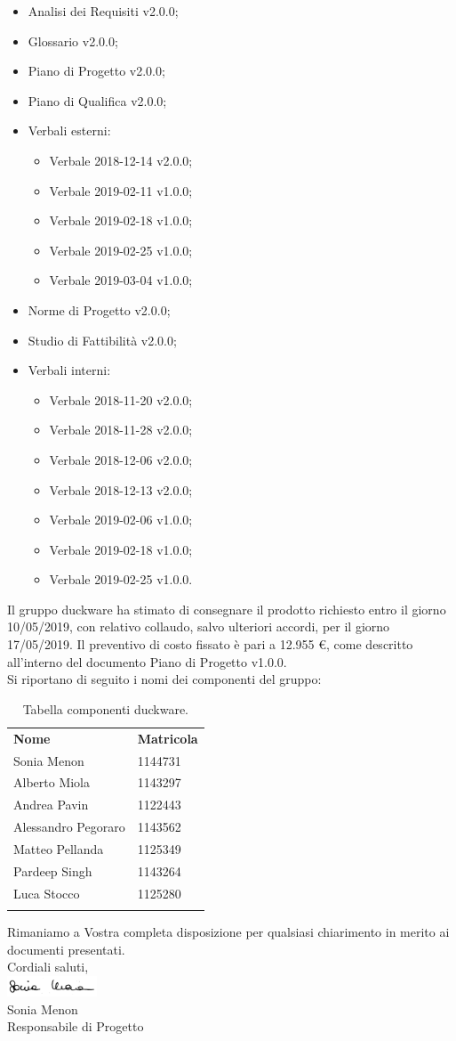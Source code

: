 \documentclass[a4paper,12pt]{article}
\begin{document}
\begin{itemize}
\item Analisi dei Requisiti v2.0.0;
\item Glossario v2.0.0;
\item Piano di Progetto v2.0.0;
\item Piano di Qualifica v2.0.0;
\item Verbali esterni:
	\begin{itemize}
		\item Verbale 2018-12-14 v2.0.0;
		\item Verbale 2019-02-11 v1.0.0;
		\item Verbale 2019-02-18 v1.0.0;
		\item Verbale 2019-02-25 v1.0.0;
		\item Verbale 2019-03-04 v1.0.0;
	\end{itemize}
\item Norme di Progetto v2.0.0;
\item Studio di Fattibilità v2.0.0;
\item Verbali interni:
	\begin{itemize}
		\item Verbale 2018-11-20 v2.0.0;
		\item Verbale 2018-11-28 v2.0.0;
		\item Verbale 2018-12-06 v2.0.0;
		\item Verbale 2018-12-13 v2.0.0;
		\item Verbale 2019-02-06 v1.0.0;
		\item Verbale 2019-02-18 v1.0.0;
		\item Verbale 2019-02-25 v1.0.0.
	\end{itemize}
\end{itemize}
Il gruppo duckware ha stimato di consegnare il prodotto richiesto entro il giorno 10/05/2019, con relativo collaudo, salvo ulteriori accordi, per il giorno 17/05/2019. Il preventivo di costo fissato è pari a 12.955 \euro, come descritto all’interno del documento Piano di Progetto v1.0.0.\\[0.5cm]
Si riportano di seguito i nomi dei componenti del gruppo:
\begin{center}
	\renewcommand{\arraystretch}{1.5}
	\begin{longtable}{  p{4cm}  p{2cm}  }
		\rowcolor{tableHeadYellow}
		\textbf{Nome}   & \textbf{Matricola} \\
		Sonia Menon & 1144731\\
		Alberto Miola & 1143297\\
		Andrea Pavin & 1122443\\
		Alessandro Pegoraro & 1143562\\
		Matteo Pellanda & 1125349\\
		Pardeep Singh & 1143264\\
		Luca Stocco & 1125280\\
		\rowcolor{white}
		\caption{Tabella componenti duckware.}
	\end{longtable}
\end{center}
Rimaniamo a Vostra completa disposizione per qualsiasi chiarimento in merito ai documenti presentati.\\[1cm]
Cordiali saluti,\\
\includegraphics[width=0.2\textwidth]{../images/firme/firma_sonia.png}\\
Sonia Menon\\
Responsabile di Progetto
\vfill
\end{document}
